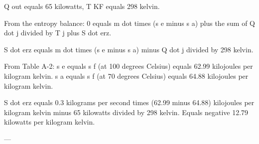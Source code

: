 Q out equals 65 kilowatts, T KF equals 298 kelvin.  

From the entropy balance:  
0 equals m dot times (s e minus s a) plus the sum of Q dot j divided by T j plus S dot erz.  

S dot erz equals m dot times (s e minus s a) minus Q dot j divided by 298 kelvin.  

From Table A-2:  
s e equals s f (at 100 degrees Celsius) equals 62.99 kilojoules per kilogram kelvin.  
s a equals s f (at 70 degrees Celsius) equals 64.88 kilojoules per kilogram kelvin.  

S dot erz equals 0.3 kilograms per second times (62.99 minus 64.88) kilojoules per kilogram kelvin minus 65 kilowatts divided by 298 kelvin.  
Equals negative 12.79 kilowatts per kilogram kelvin.  

---